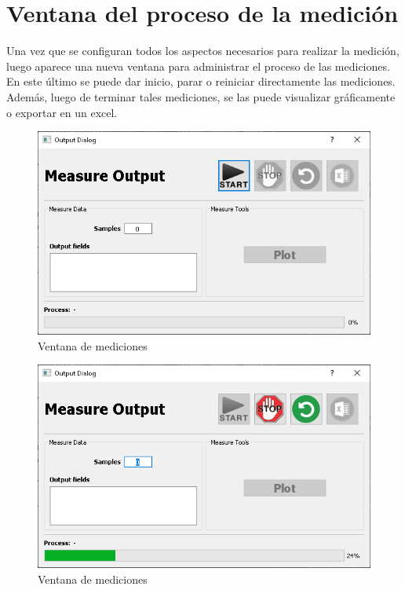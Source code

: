 \section{Ventana del proceso de la medici\'on}
Una vez que se configuran todos los aspectos necesarios para realizar la medici\'on,
luego aparece una nueva ventana para administrar el proceso de las mediciones.
En este \'ultimo se puede dar inicio, parar o reiniciar directamente las mediciones.
Adem\'as, luego de terminar tales mediciones, se las puede visualizar gr\'aficamente o exportar en un excel.

\begin{figure}[H]
    \centering
        \includegraphics[scale=0.8]{../screenshots/output_screen.PNG}
    \caption{Ventana de mediciones}
\end{figure}

\begin{figure}[H]
    \centering
        \includegraphics[scale=0.8]{../screenshots/measuring_output.PNG}
    \caption{Ventana de mediciones}
\end{figure}

